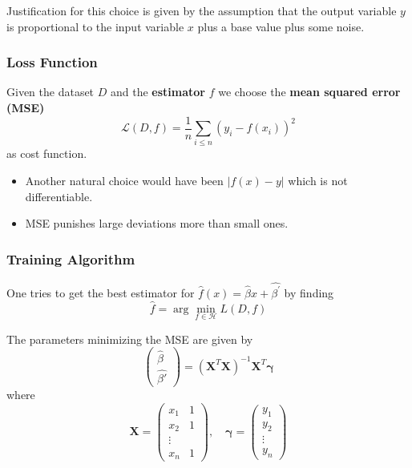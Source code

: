 
Justification for this choice is given by the assumption that the output variable $y$ is proportional to the input variable $x$ plus a base value plus some noise.

\subsubsection{Loss Function}
Given the dataset $D$ and the \textbf{estimator} $f$ we choose the \textbf{mean squared error (MSE)}
\begin{equation*}
    \mathcal{L}(D,f)=\frac{1}{n}\sum_{i\leq n}{\left(y_i-f(x_i)\right)}^2
\end{equation*}
as cost function.


\begin{itemize}
    \item Another natural choice would have been $|f(x)-y|$ which is not differentiable.
    \item MSE punishes large deviations more than small ones.
\end{itemize}

\subsubsection{Training Algorithm}
One tries to get the best estimator for $\hat{f}(x)=\hat{\beta}x+\widehat{\beta^{\prime}}$ by finding
\begin{equation*}
    \hat{f}=\arg\min_{f\in\mathcal{H}}L(D,f)
\end{equation*}


The parameters minimizing the MSE are given by
\begin{equation*}
    \begin{pmatrix}
        \hat{\beta} \\
        \widehat{\beta'}
    \end{pmatrix}
    ={(\mathbf{X}^T \mathbf{X})}^{-1}\mathbf{X}^T\mathbf{\gamma}
\end{equation*}
where
\begin{equation*}
    \mathbf{X}=
    \begin{pmatrix}
        x_1 & 1 \\
        x_2 & 1 \\
        \vdots  \\
        x_n & 1
    \end{pmatrix},\quad
    \mathbf{\gamma}=
    \begin{pmatrix}
        y_1    \\
        y_2    \\
        \vdots \\
        y_n
    \end{pmatrix}
\end{equation*}

